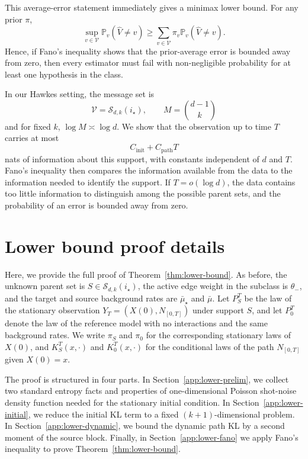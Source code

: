 \documentclass{article}
\newcommand{\thetalo}{\theta_-}
\newcommand{\Pbb}{\mathbb{P}}
\begin{document}
This average-error statement immediately gives a minimax lower bound. For any prior \(\pi\),
\[
  \sup_{v\in\mathcal V}\Pbb_v(\widehat V\neq v)
  \ge 
  \sum_{v\in\mathcal V}\pi_v \Pbb_v(\widehat V\neq v).
\]
Hence, if Fano's inequality shows that the prior-average error is bounded away from zero, then every estimator must fail with non-negligible probability for at least one hypothesis in the class.

In our Hawkes setting, the message set is
\[
  \mathcal V=\mathcal S_{d,k}(i_\star),
  \qquad
  M=\binom{d-1}{k}
\]
and for fixed \(k\), \(\log M\asymp \log d\). We show that the observation up to time \(T\) carries at most
\[
  C_{\mathrm{init}}+C_{\mathrm{path}}T
\]
nats of information about this support, with constants independent of \(d\) and \(T\). Fano's inequality then compares the information available from the data to the information needed to identify the support. 
If \(T=o(\log d)\), the data contains too little information to distinguish among the possible parent sets, and the probability of an error is bounded away from zero.

\section{Lower bound proof details}\label{app:lower-bound}
Here, we provide the full proof of Theorem~\ref{thm:lower-bound}. 
As before, the unknown parent set is $S\in\mathcal S_{d,k}(i_\star)$, the active edge weight in the subclass is $\thetalo$, and the target and source background rates are $\bar\mu_\star$ and $\bar\mu$. Let $P_S^T$ be the law of the stationary observation $Y_T=(X(0),N_{[0,T]})$ under support $S$, and let $P_0^T$ denote the law of the reference model with no interactions and the same background rates. We write $\pi_S$ and $\pi_0$ for the corresponding stationary laws of $X(0)$, and $K_S^T(x,\cdot)$ and $K_0^T(x,\cdot)$ for the conditional laws of the path $N_{[0,T]}$ given $X(0)=x$.

The proof is structured in four parts. In Section~\ref{app:lower-prelim}, we collect two standard entropy facts and properties of one-dimensional Poisson shot-noise density function needed for the stationary initial
condition. In Section~\ref{app:lower-initial}, we reduce the initial KL term to a fixed $(k+1)$-dimensional
problem. In Section~\ref{app:lower-dynamic}, we bound the dynamic path KL by a second moment of the source
block. Finally, in Section~\ref{app:lower-fano} we apply Fano's inequality to prove Theorem~\ref{thm:lower-bound}.
\end{document}
